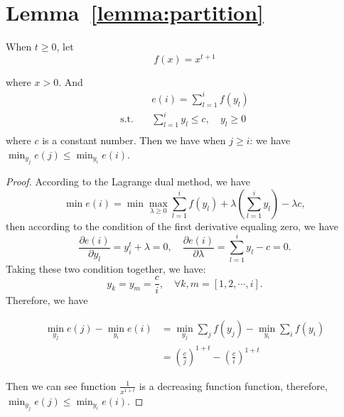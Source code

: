 \section{Lemma~\ref{lemma:partition}}
\begin{lemma}\label{lemma:partition}
    When $t\ge 0$, let 
    \[
    f(x)=x^{t+1}
    \]
    
    where $x>0$. And
    \begin{equation}
        \begin{aligned}
            \quad& e(i) = \sum_{l=1}^i f(y_l) \\
            \textrm{s.t.}\quad & \sum_{l=1}^i y_l \leq c, \quad y_l \ge 0\\
        \end{aligned}
    \end{equation}
    where $c$ is a constant number. Then we have when $j\ge i$: we have $\min_{y_j} e(j) \leq \min_{y_i} e(i)$. 
    

\end{lemma}

\begin{proof}

    According to the Lagrange dual method, we have
    \[
        \min e(i) = \min \max_{\lambda\ge 0} \sum_{l=1}^i f(y_l) + \lambda (\sum_{l=1}^i y_l) - \lambda c,
    \]
    then according to the condition of the first derivative equaling zero, we have
    \[
        \frac{\partial e(i)}{\partial y_l} = y_i^{t} + \lambda = 0, \quad \frac{\partial e(i)}{\partial \lambda} = \sum_{l=1}^i y_l - c = 0.
    \]
    Taking these two condition together, we have:
    \[
        y_k = y_m = \frac{c}{i}, \quad \forall k,m = [1,2,\cdots, i].    
    \]
    Therefore, we have

    \begin{align*}
        \min_{y_j} e(j) - \min_{y_i} e(i) & =\min_{y_j} \sum_j f(y_j) - \min_{y_i}\sum_i f(y_i)\\
        &= (\frac{c}{j})^{1+t} - (\frac{c}{i})^{1+t} 
    \end{align*}

    Then we can see function $\frac{1}{x^{1+t}}$ is a decreasing function function, therefore, $\min_{y_j} e(j) \leq \min_{y_i} e(i)$.
    



    
\end{proof}

